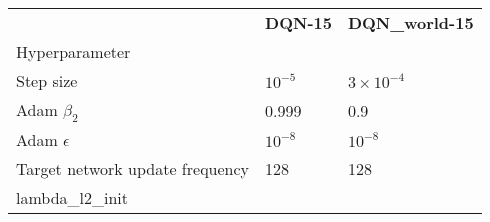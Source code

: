 \begin{tabular}{lll}
 & \bfseries DQN-15 & \bfseries DQN_world-15 \\
Hyperparameter &  &  \\
Step size & $10^{-5}$ & $3 \times 10^{-4}$ \\
Adam $\beta_2$ & 0.999 & 0.9 \\
Adam $\epsilon$ & $10^{-8}$ & $10^{-8}$ \\
Target network update frequency & 128 & 128 \\
lambda_l2_init &  &  \\
\end{tabular}
